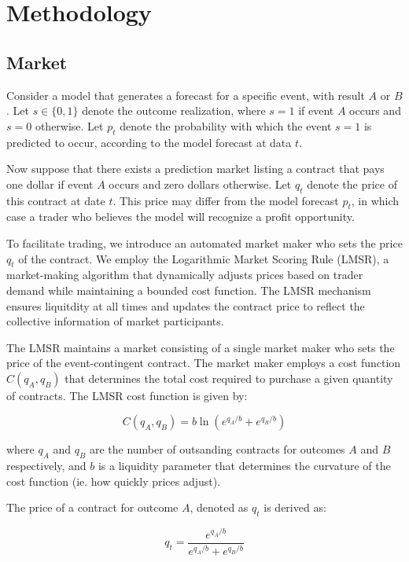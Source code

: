 \section{Methodology}

\subsection{Market}


Consider a model that generates a forecast for a specific event, with result $A$ or $B$.
Let $s \in \{0, 1\}$ denote the outcome realization, where $s = 1$ if 
event $A$ occurs and $s = 0$ otherwise. Let $p_t$ denote the probability 
with which the event $s = 1$ is predicted to occur, according to the model 
forecast at data $t$. 

Now suppose that there exists a prediction market listing a contract 
that pays one dollar if event $A$ occurs and zero dollars otherwise. 
Let $q_t$ denote the price of this contract at date $t$. This price 
may differ from the model forecast $p_t$, in which case a trader who 
believes the model will recognize a profit opportunity.

To facilitate trading, we introduce an automated market maker who sets the price
$q_t$ of the contract. We employ the Logarithmic Market Scoring Rule (LMSR),
a market-making algorithm that dynamically adjusts prices based on trader demand 
while maintaining a bounded cost function. 
The LMSR mechanism ensures liquitdity at all times and updates the contract 
price to reflect the collective information of market participants.

The LMSR maintains a market consisting of a single market maker who sets 
the price of the event-contingent contract. The market maker employs 
a cost function $C(q_A, q_B)$ that determines the total cost 
required to purchase a given quantity of contracts. 
The LMSR cost function is given by:

\begin{equation}
    C(q_A, q_B) = b \ln (e^{q_A / b} + e^{q_B / b})
\end{equation}

where $q_A$ and $q_B$ are the number of outsanding contracts for outcomes 
$A$ and $B$ respectively, and $b$ is a liquidity parameter that determines  
the curvature of the cost function (ie. how quickly prices adjust).

The price of a contract for outcome $A$, denoted as $q_t$ is derived as:

\begin{equation}
    q_t = \frac{e^{q_A / b}}{e^{q_A / b} + e^{q_B / b}}
\end{equation}

